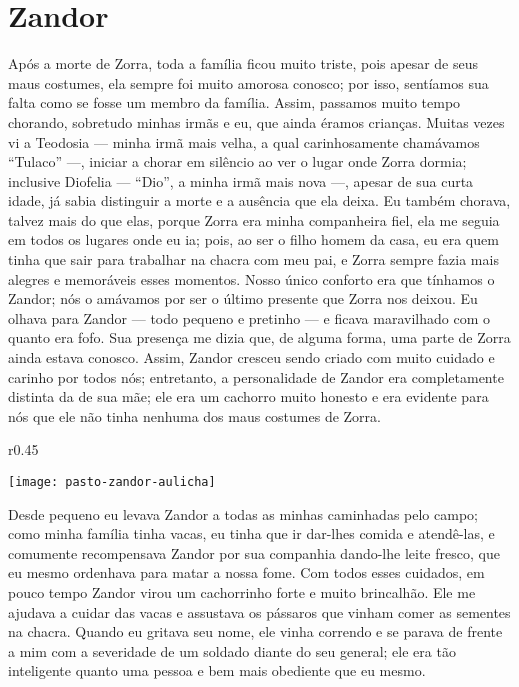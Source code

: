 \cleardoublepage
\newpage
\ifdefined\EnableIncludeImages
\fi
\chapter{Zandor}

Após a morte de Zorra, toda a família ficou muito triste, pois apesar de seus maus costumes, ela sempre foi muito amorosa conosco; por isso, sentíamos sua falta como se fosse um membro da família. 
Assim, passamos muito tempo chorando, sobretudo minhas irmãs e eu, que ainda éramos crianças. 
Muitas vezes vi a Teodosia ---  minha irmã mais velha, a qual carinhosamente chamávamos ``Tulaco'' ---, iniciar a chorar em silêncio ao ver o lugar onde Zorra dormia; inclusive Diofelia  --- ``Dio'', a minha irmã mais nova ---, apesar de sua curta idade, já sabia distinguir a morte e a ausência que ela deixa. 
Eu também chorava, talvez mais do que elas, porque Zorra era minha companheira fiel, ela me seguia em todos os lugares onde eu ia; pois, ao ser o filho homem da casa, eu era quem tinha que sair para trabalhar na chacra com meu pai, e Zorra sempre fazia mais alegres e memoráveis esses momentos.
Nosso único conforto era que tínhamos o Zandor; nós o amávamos por ser o último presente que Zorra nos deixou.
Eu olhava para Zandor --- todo pequeno e pretinho --- e ficava maravilhado com o quanto era fofo. Sua presença me dizia que, de alguma forma, uma parte de Zorra ainda estava conosco. 
Assim, Zandor cresceu sendo criado com muito cuidado e carinho por todos nós;
entretanto, a personalidade de Zandor era completamente distinta da de sua mãe; ele era um cachorro muito honesto e era evidente para nós que ele não tinha nenhuma dos maus costumes de Zorra. 
\ifdefined\EnableIncludeImages
\begin{wrapfigure}{r}{0.45\textwidth}
  \begin{center}
  \vspace{-20pt}
    \texttt{[image: pasto-zandor-aulicha]}
  \end{center}
  \vspace{-20pt}
\end{wrapfigure}
\fi
Desde pequeno eu levava Zandor a todas as minhas caminhadas pelo campo; como minha família tinha vacas, eu tinha que ir dar-lhes comida e atendê-las, e comumente recompensava Zandor por sua companhia dando-lhe leite fresco, que eu mesmo ordenhava para matar a nossa fome. 
Com todos esses cuidados, em pouco tempo Zandor virou um cachorrinho forte e muito brincalhão.
Ele me ajudava a cuidar das vacas e assustava os pássaros que vinham comer as sementes na chacra. Quando eu gritava seu nome, ele vinha correndo e se parava de frente a mim com a severidade de um soldado diante do seu general; ele era tão inteligente quanto uma pessoa e bem mais obediente que eu mesmo.

